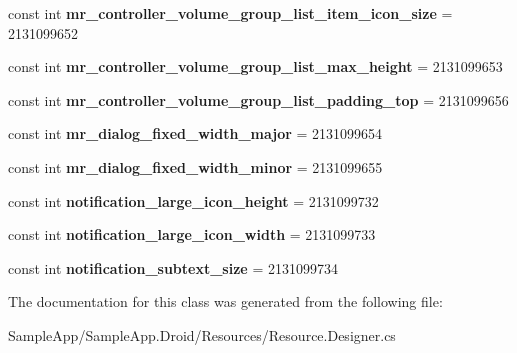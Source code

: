 \begin{DoxyCompactItemize}
const int {\bfseries mr\+\_\+controller\+\_\+volume\+\_\+group\+\_\+list\+\_\+item\+\_\+icon\+\_\+size} = 2131099652
\item 
\mbox{\label{class_sample_app_1_1_droid_1_1_resource_1_1_dimension_a5423c500dc03f019a62e30a40b7997a3}} 
const int {\bfseries mr\+\_\+controller\+\_\+volume\+\_\+group\+\_\+list\+\_\+max\+\_\+height} = 2131099653
\item 
\mbox{\label{class_sample_app_1_1_droid_1_1_resource_1_1_dimension_aa5e8b7886715b07b5e2b434257929fef}} 
const int {\bfseries mr\+\_\+controller\+\_\+volume\+\_\+group\+\_\+list\+\_\+padding\+\_\+top} = 2131099656
\item 
\mbox{\label{class_sample_app_1_1_droid_1_1_resource_1_1_dimension_a470eca9ed3234622016b12eb500ee2dc}} 
const int {\bfseries mr\+\_\+dialog\+\_\+fixed\+\_\+width\+\_\+major} = 2131099654
\item 
\mbox{\label{class_sample_app_1_1_droid_1_1_resource_1_1_dimension_a2ad9dc1802945b32e910883bc0dc675e}} 
const int {\bfseries mr\+\_\+dialog\+\_\+fixed\+\_\+width\+\_\+minor} = 2131099655
\item 
\mbox{\label{class_sample_app_1_1_droid_1_1_resource_1_1_dimension_a7e6157127cb2a4b35d8681334bdc0ebc}} 
const int {\bfseries notification\+\_\+large\+\_\+icon\+\_\+height} = 2131099732
\item 
\mbox{\label{class_sample_app_1_1_droid_1_1_resource_1_1_dimension_af599abb3d27603f61df79b4a2e45c5ff}} 
const int {\bfseries notification\+\_\+large\+\_\+icon\+\_\+width} = 2131099733
\item 
\mbox{\label{class_sample_app_1_1_droid_1_1_resource_1_1_dimension_a4dfa76db862771c673a602e02f7d7dd2}} 
const int {\bfseries notification\+\_\+subtext\+\_\+size} = 2131099734
\end{DoxyCompactItemize}


The documentation for this class was generated from the following file\+:\begin{DoxyCompactItemize}
\item 
Sample\+App/\+Sample\+App.\+Droid/\+Resources/Resource.\+Designer.\+cs\end{DoxyCompactItemize}
